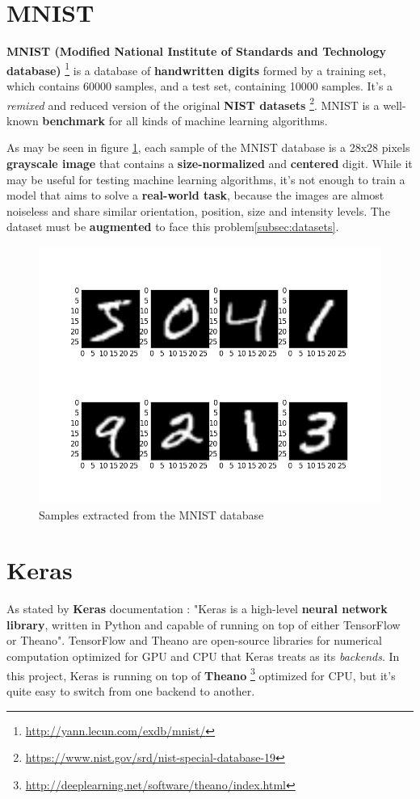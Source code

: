 \section{MNIST}\label{sec:MNIST}
\textbf{MNIST (Modified National Institute of Standards and Technology database)} \footnote{\url{http://yann.lecun.com/exdb/mnist/}} is a database of \textbf{handwritten digits} formed by a training set, which contains 60000 samples, and a test set, containing 10000 samples. It's a \textit{remixed} and reduced version of the original \textbf{NIST datasets} \footnote{\url{https://www.nist.gov/srd/nist-special-database-19}}. MNIST is a well-known \textbf{benchmark} for all kinds of machine learning algorithms.

As may be seen in figure \ref{fig:mnist}, each sample of the MNIST database is a 28x28 pixels \textbf{grayscale image} that contains a \textbf{size-normalized} and \textbf{centered} digit. While it may be useful for testing machine learning algorithms, it's not enough to train a model that aims to solve a \textbf{real-world task}, because the images are almost noiseless and share similar orientation, position, size and intensity levels. The dataset must be \textbf{augmented} to face this problem\ref{subsec:datasets}.
\begin{figure}
	\centering
	\includegraphics[width=12cm, keepaspectratio]{figures/mnist.png}
	\caption{Samples extracted from the MNIST database}
	\label{fig:mnist}
\end{figure}

\section{Keras}\label{sec:keras}
As stated by \textbf{Keras} documentation \cite{chollet2015keras}: "Keras is a high-level \textbf{neural network library}, written in Python and capable of running on top of either TensorFlow or Theano". TensorFlow and Theano are open-source libraries for numerical computation optimized for GPU and CPU that Keras treats as its \textit{backends}. In this project, Keras is running on top of \textbf{Theano} \footnote{\url{http://deeplearning.net/software/theano/index.html}} optimized for CPU, but it's quite easy to switch from one backend to another.

